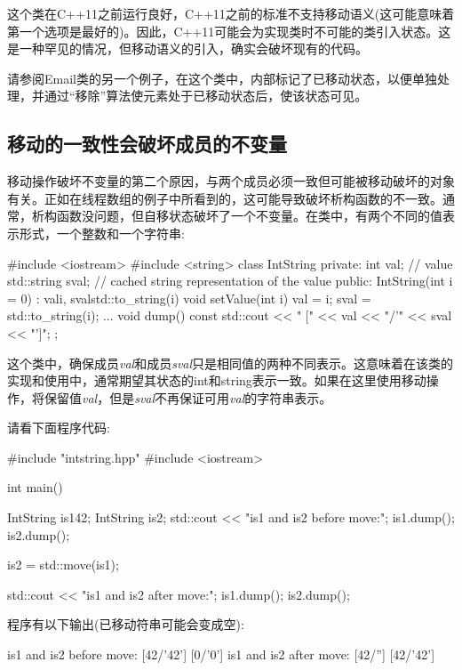 这个类在C++11之前运行良好，C++11之前的标准不支持移动语义(这可能意味着第一个选项是最好的)。因此，C++11可能会为实现类时不可能的类引入状态。这是一种罕见的情况，但移动语义的引入，确实会破坏现有的代码。

请参阅Email类的另一个例子，在这个类中，内部标记了已移动状态，以便单独处理，并通过“移除”算法使元素处于已移动状态后，使该状态可见。

\subsection{移动的一致性会破坏成员的不变量}

移动操作破坏不变量的第二个原因，与两个成员必须一致但可能被移动破坏的对象有关。正如在线程数组的例子中所看到的，这可能导致破坏析构函数的不一致。通常，析构函数没问题，但自移状态破坏了一个不变量。在类中，有两个不同的值表示形式，一个整数和一个字符串:

\begin{cppcode}
#include <iostream>
#include <string>
class IntString
{
	private:
	int val; // value
	std::string sval; // cached string representation of the value
	public:
	IntString(int i = 0)
	: val{i}, sval{std::to_string(i)} {
	}
	void setValue(int i) {
		val = i;
		sval = std::to_string(i);
	}
	...
	void dump() const {
		std::cout << " [" << val << "/'" << sval << "']\n";
	}
};
\end{cppcode}

这个类中，确保成员\textit{val}和成员\textit{sval}只是相同值的两种不同表示。这意味着在该类的实现和使用中，通常期望其状态的int和string表示一致。如果在这里使用移动操作，将保留值\textit{val}，但是\textit{sval}不再保证可用\textit{val}的字符串表示。

请看下面程序代码:

\begin{cppcode}
#include "intstring.hpp"
#include <iostream>

int main()
{
	IntString is1{42};
	IntString is2;
	std::cout << "is1 and is2 before move:\n";
	is1.dump();
	is2.dump();

	is2 = std::move(is1);

	std::cout << "is1 and is2 after move:\n";
	is1.dump();
	is2.dump();
}
\end{cppcode}

程序有以下输出(已移动符串可能会变成空):

\begin{outputcode}
is1 and is2 before move:
 [42/'42']
 [0/'0']
is1 and is2 after move:
 [42/'']
 [42/'42']
\end{outputcode}

